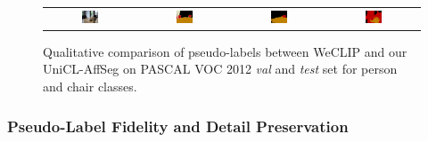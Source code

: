 \begin{figure}[ht]
\begin{tcolorbox}[colframe=black!60, colback=white, boxrule=0.8pt, arc=2pt, left=2pt, right=2pt, top=2pt, bottom=2pt]
\begin{tabular}{cccc}
      
      \includegraphics[width=0.20\textwidth,height=0.20\textwidth]
      {figures/person_and_chair/originals/2008_003477}
                &
      \includegraphics[width=0.20\textwidth,height=0.20\textwidth]
      {figures/person_and_chair/gt/2008_003477}
                &
      \includegraphics[width=0.20\textwidth,height=0.20\textwidth]
      {figures/person_and_chair/weclip/2008_003477_[8, 10]}
                &
      \includegraphics[width=0.20\textwidth,height=0.20\textwidth]
      {figures/person_and_chair/ours/2008_003477_[8, 10]}    \\


    \end{tabular}

    \caption{Qualitative comparison of pseudo-labels between WeCLIP and our UniCL-AffSeg on PASCAL VOC 2012 \textit{val} and \textit{test} set for person and chair classes.}
    \label{fig:qualitative_comparison_pseudolabel_person_chair}
  \end{tcolorbox}
\end{figure}

\subsubsection{Pseudo-Label Fidelity and Detail Preservation}
\label{subsubsec:pseudolabel_fidelity}

